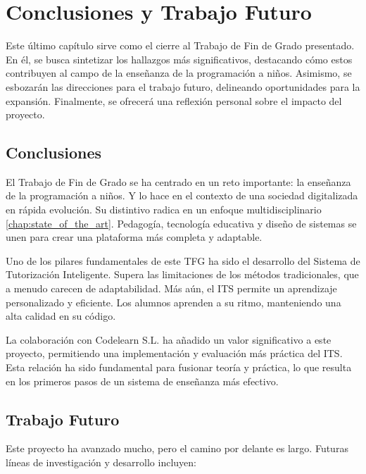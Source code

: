 \chapter{Conclusiones y Trabajo Futuro} \label{chap:conclusiones}

Este último capítulo sirve como el cierre al Trabajo de Fin de Grado presentado. En él, se busca sintetizar los hallazgos más significativos, destacando cómo estos contribuyen al campo de la enseñanza de la programación a niños. Asimismo, se esbozarán las direcciones para el trabajo futuro, delineando oportunidades para la expansión. Finalmente, se ofrecerá una reflexión personal sobre el impacto del proyecto.

\section{Conclusiones}

El Trabajo de Fin de Grado se ha centrado en un reto importante: la enseñanza de la programación a niños. Y lo hace en el contexto de una sociedad digitalizada en rápida evolución. Su distintivo radica en un enfoque multidisciplinario \ref{chap:state_of_the_art}. Pedagogía, tecnología educativa y diseño de sistemas se unen para crear una plataforma más completa y adaptable.


Uno de los pilares fundamentales de este TFG ha sido el desarrollo del Sistema de Tutorización Inteligente. Supera las limitaciones de los métodos tradicionales, que a menudo carecen de adaptabilidad. Más aún, el ITS permite un aprendizaje personalizado y eficiente. Los alumnos aprenden a su ritmo, manteniendo una alta calidad en su código.

La colaboración con Codelearn S.L. ha añadido un valor significativo a este proyecto, permitiendo una implementación y evaluación más práctica del ITS. Esta relación ha sido fundamental para fusionar teoría y práctica, lo que resulta en los primeros pasos de un sistema de enseñanza más efectivo.

\section{Trabajo Futuro}

Este proyecto ha avanzado mucho, pero el camino por delante es largo. Futuras líneas de investigación y desarrollo incluyen:



